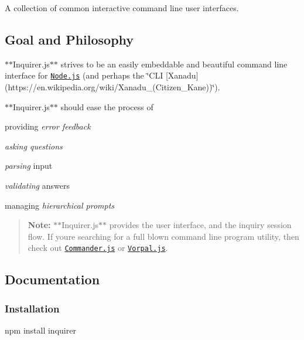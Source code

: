 \href{http://badge.fury.io/js/inquirer}{\tt } \href{http://travis-ci.org/SBoudrias/Inquirer.js}{\tt } \href{https://david-dm.org/SBoudrias/Inquirer.js}{\tt }

A collection of common interactive command line user interfaces.

\subsection*{Goal and Philosophy}



$\ast$$\ast${\ttfamily Inquirer.\+js}$\ast$$\ast$ strives to be an easily embeddable and beautiful command line interface for \href{https://nodejs.org/}{\tt Node.\+js} (and perhaps the \char`\"{}\+C\+L\+I \mbox{[}\+Xanadu\mbox{]}(https\+://en.\+wikipedia.\+org/wiki/\+Xanadu\+\_\+(\+Citizen\+\_\+\+Kane))\char`\"{}).

$\ast$$\ast${\ttfamily Inquirer.\+js}$\ast$$\ast$ should ease the process of
\begin{DoxyItemize}
\item providing {\itshape error feedback}
\item {\itshape asking questions}
\item {\itshape parsing} input
\item {\itshape validating} answers
\item managing {\itshape hierarchical prompts}
\end{DoxyItemize}

\begin{quote}
{\bfseries Note\+:} $\ast$$\ast${\ttfamily Inquirer.\+js}$\ast$$\ast$ provides the user interface, and the inquiry session flow. If you\textquotesingle{}re searching for a full blown command line program utility, then check out \href{https://github.com/visionmedia/commander.js}{\tt Commander.\+js} or \href{https://github.com/dthree/vorpal}{\tt Vorpal.\+js}. \end{quote}


\subsection*{Documentation}

\subsubsection*{Installation}


\begin{DoxyCode}
npm install inquirer
\end{DoxyCode}



